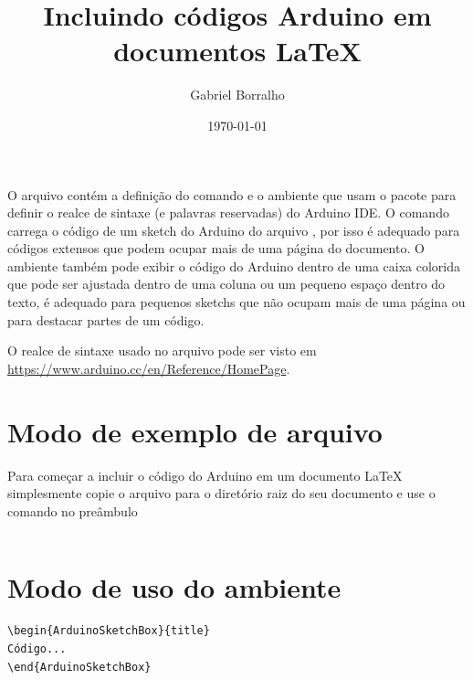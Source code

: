 \documentclass{article}
\title{Incluindo códigos Arduino em documentos \LaTeX{}}
\author{Gabriel Borralho}
\date{\today}
\begin{document}
\maketitle

O arquivo  contém a definição do comando  e o ambiente \linebreak {} que usam o pacote  para definir o realce de sintaxe (e palavras reservadas) do Arduino IDE. O comando  carrega o código de um sketch do Arduino do arquivo , por isso é adequado para códigos extensos que podem ocupar mais de uma página do documento. O ambiente  também pode exibir o código do Arduino dentro de uma caixa colorida que pode ser ajustada dentro de uma coluna ou um pequeno espaço dentro do texto, é adequado para pequenos sketchs que não ocupam mais de uma página ou para destacar partes de um código.

O realce de sintaxe usado no arquivo  pode ser visto em \url{https://www.arduino.cc/en/Reference/HomePage}.

\section{Modo de exemplo de arquivo }

Para começar a incluir o código do Arduino em um documento \LaTeX{} simplesmente copie o arquivo  para o diretório raiz do seu documento e use o comando  no preâmbulo


\begin{verbatim}

\end{verbatim}

\section{Modo de uso do ambiente }

\begin{verbatim}
\begin{ArduinoSketchBox}{title}
Código...
\end{ArduinoSketchBox}
\end{verbatim}
\end{document}
